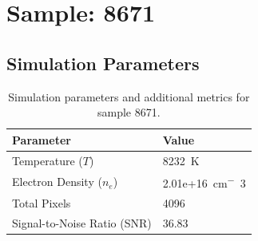 \documentclass[a4paper,11pt]{article}
\begin{document}
\clearpage

\section{Sample: 8671}
\subsection{Simulation Parameters}
\begin{table}[h!]
    \centering
    \begin{tabular}{ll}
        \toprule
        \textbf{Parameter} & \textbf{Value} \\
        \midrule
        Temperature ($T$) & 8232 \,\si{K} \\
        Electron Density ($n_e$) & 2.01e+16 \,\si{cm^-3} \\
        Total Pixels & 4096 \\
        Signal-to-Noise Ratio (SNR) & 36.83 \\
        \bottomrule
    \end{tabular}
    \caption{Simulation parameters and additional metrics for sample 8671.}
    \label{tab:params_8671}
\end{table}
\end{document}
